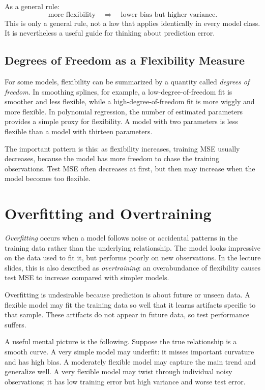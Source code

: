 {As a general rule:
\begin{equation}
  \text{more flexibility} \quad \Longrightarrow \quad
  \text{lower bias but higher variance}.
  \label{eq:ch2-flexibility-rule}
\end{equation}
This is only a general rule, not a law that applies identically in every model class.  It is nevertheless a useful guide for thinking about prediction error.

\subsection{Degrees of Freedom as a Flexibility Measure}

For some models, flexibility can be summarized by a quantity called \emph{degrees of freedom}.  In smoothing splines, for example, a low-degree-of-freedom fit is smoother and less flexible, while a high-degree-of-freedom fit is more wiggly and more flexible.  In polynomial regression, the number of estimated parameters provides a simple proxy for flexibility.  A model with two parameters is less flexible than a model with thirteen parameters.

The important pattern is this: as flexibility increases, training MSE usually decreases, because the model has more freedom to chase the training observations.  Test MSE often decreases at first, but then may increase when the model becomes too flexible.

\section{Overfitting and Overtraining}

\emph{Overfitting} occurs when a model follows noise or accidental patterns in the training data rather than the underlying relationship.  The model looks impressive on the data used to fit it, but performs poorly on new observations.  In the lecture slides, this is also described as \emph{overtraining}: an overabundance of flexibility causes test MSE to increase compared with simpler models.

Overfitting is undesirable because prediction is about future or unseen data.  A flexible model may fit the training data so well that it learns artifacts specific to that sample.  These artifacts do not appear in future data, so test performance suffers.

A useful mental picture is the following.  Suppose the true relationship is a smooth curve.  A very simple model may underfit: it misses important curvature and has high bias.  A moderately flexible model may capture the main trend and generalize well.  A very flexible model may twist through individual noisy observations; it has low training error but high variance and worse test error.

}
